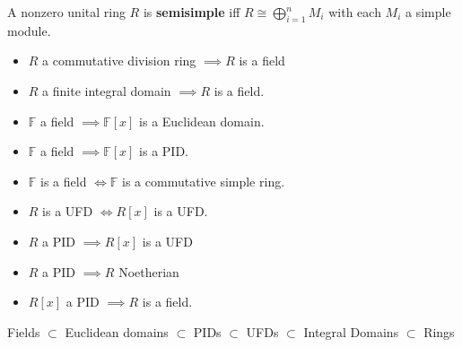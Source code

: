 \begin{definition}[Semisimple]

A nonzero unital ring \(R\) is \textbf{semisimple} iff
\(R \cong \bigoplus_{i=1}^n M_i\) with each \(M_i\) a simple module.

\end{definition}

\begin{proposition}

\begin{itemize}
\tightlist
\item
  \(R\) a commutative division ring \(\implies R\) is a field
\item
  \(R\) a finite integral domain \(\implies R\) is a field.
\item
  \({\mathbb{F}}\) a field \(\implies {\mathbb{F}}[x]\) is a Euclidean
  domain.
\item
  \({\mathbb{F}}\) a field \(\implies {\mathbb{F}}[x]\) is a PID.
\item
  \({\mathbb{F}}\) is a field \(\iff {\mathbb{F}}\) is a commutative
  simple ring.
\item
  \(R\) is a UFD \(\iff R[x]\) is a UFD.
\item
  \(R\) a PID \(\implies R[x]\) is a UFD
\item
  \(R\) a PID \(\implies R\) Noetherian
\item
  \(R[x]\) a PID \(\implies R\) is a field.
\end{itemize}

\end{proposition}

\begin{proposition}

Fields \(\subset\) Euclidean domains \(\subset\) PIDs \(\subset\) UFDs
\(\subset\) Integral Domains \(\subset\) Rings

\end{proposition}

